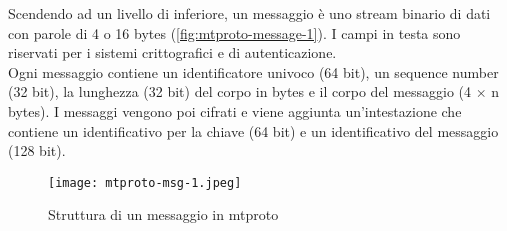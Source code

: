 Scendendo ad un livello di inferiore, un messaggio è uno stream binario di dati con parole di 4 o 16 bytes (\autoref{fig:mtproto-message-1}).
I campi in testa sono riservati per i sistemi crittografici e di autenticazione. \\
Ogni messaggio contiene un identificatore univoco (64 bit), un sequence number (32 bit), la lunghezza (32 bit) del corpo in bytes e il corpo del messaggio (4 $\times$ n bytes).
I messaggi vengono poi cifrati e viene aggiunta un'intestazione che contiene un identificativo per la chiave (64 bit) e un identificativo del messaggio (128 bit). \\

\begin{figure}[!h]
    \texttt{[image: mtproto-msg-1.jpeg]}
    \caption{Struttura di un messaggio in \gls{mtproto} \cite{man:mtproto}} \label{fig:mtproto-message-1}
\end{figure}

